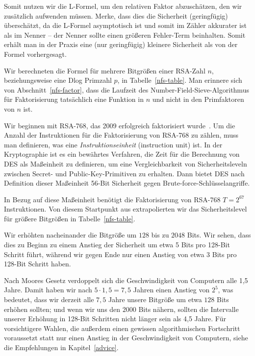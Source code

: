 \begin{refsegment}
Somit nutzen wir die L-Formel, um den relativen Faktor abzuschätzen, den wir zusätzlich aufwenden müssen. Merke, dass dies die Sicherheit (geringfügig) überschätzt, da die L-Formel asymptotisch ist und somit im Zähler akkurater ist als im Nenner -- der Nenner sollte einen größeren Fehler-Term beinhalten. Somit erhält man in der Praxis eine (nur geringfügig) kleinere Sicherheit als von der Formel vorhergesagt.

Wir berechneten die Formel für mehrere Bitgrößen einer RSA-Zahl $n$, beziehungsweise eine Dlog Primzahl $p$, in Tabelle~\ref{nfs-table}. Man erinnere sich von Abschnitt~\ref{nfs-factor}, dass die Laufzeit des Number-Field-Sieve-Algorithmus für Faktorisierung tatsächlich eine Funktion in $n$ und nicht in den Primfaktoren von $n$ ist.


Wir beginnen mit RSA-768, das 2009 erfolgreich faktorisiert wurde~\cite{factor768_2010}. Um die Anzahl der Instruktionen für die Faktorisierung von RSA-768 zu zählen, muss man definieren, was eine {\em Instruktionseinheit} (instruction unit) ist. In der Kryptographie ist es ein bewährtes Verfahren, die Zeit für die Berechnung von DES als Maßeinheit zu definieren, um eine Vergleichbarkeit von Sicherheitsleveln zwischen Secret- und Public-Key-Primitiven zu erhalten. Dann bietet DES nach Definition dieser Maßeinheit 56-Bit Sicherheit gegen Brute-force-Schlüsselangriffe.

In Bezug auf diese Maßeinheit benötigt die Faktorisierung von RSA-768 $T=2^{67}$ Instruktionen. Von diesem Startpunkt aus extrapolierten wir das Sicherheitslevel für größere Bitgrößen in Tabelle~\ref{nfs-table}.

Wir erhöhten nacheinander die Bitgröße um $128$ bis zu $2048$ Bits. Wir sehen, dass dies zu Beginn zu einem Anstieg der Sicherheit um etwa 5 Bits pro 128-Bit Schritt führt, während wir gegen Ende nur einen Anstieg von etwa 3 Bits pro 128-Bit Schritt haben.

Nach Moores Gesetz verdoppelt sich die Geschwindigkeit von Computern alle 1,5 Jahre. Damit haben wir nach $5\cdot 1,5 = 7,5$ Jahren einen Anstieg von $2^5$, was bedeutet, dass wir derzeit alle $7,5$ Jahre unsere Bitgröße um etwa $128$ Bits erhöhen sollten; und wenn wir uns den $2000$ Bits nähern, sollten die Intervalle unserer Erhöhung in 128-Bit Schritten nicht länger sein als 4,5 Jahre. Für vorsichtigere Wahlen, die außerdem einen gewissen algorithmischen Fortschritt voraussetzt statt nur einen Anstieg in der Geschwindigkeit von Computern, siehe die Empfehlungen in Kapitel~\ref{advice}.


\end{refsegment}
